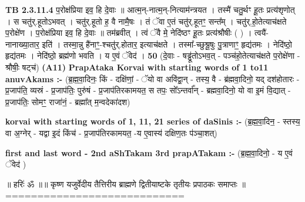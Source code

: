 \documentclass[17pt]{extarticle}
\begin{document}
                                \textbf{ TB 2.3.11.4} \newline
                  प॒रोक्ष॑प्रिया इव॒ हि दे॒वाः ॥ आत्म॒न्-नात्म॒न्-नित्याम॑न्त्रयत । तस्मै॑ चतु॒र्थꣳ हू॒तः प्रत्य॑शृणोत् । स चतु॑र्.हूतोऽभवत् । चतु॑र्.हूतो ह॒ वै नामै॒षः । तं ॅवा ए॒तं चतु॑र्.हूतꣳ॒॒ सन्त᳚म् । चतु॑र्.हो॒तेत्याच॑क्षते प॒रोक्षे॑ण । प॒रोक्ष॑प्रिया इव॒ हि दे॒वाः ॥ तम॑ब्रवीत् । त्वं ॅवै मे॒ नेदि॑ष्ठꣳ हू॒तः प्रत्य॑श्रौषीः ( ) । त्वयै॑-नानाख्या॒तार॒ इति॑ । तस्मा॒न्नु है॑नाꣳ॒॒-श्चतु॑र्.होतार॒ इत्याच॑क्षते । तस्मा᳚-च्छुश्रू॒षुः पु॒त्राणाꣳ॒॒ हृद्य॑तमः । नेदि॑ष्ठो॒ हृद्य॑तमः । नेदि॑ष्ठो॒ ब्रह्म॑णो भवति । य ए॒वं ॅवेद॑ । \textbf{ 50} \newline
                  \newline
                                    (दे॒वाः - षड्ढू॑तोऽभव॒त् - पञ्च॑हो॒तेत्याच॑क्षते प॒रोक्षे॑णा - श्रौषीः॒ षट्च॑) \textbf{(A11)} \newline \newline
                \textbf{PrapAtaka Korvai with starting  words of 1 to11 anuvAkams :-} \newline
        (ब्र॒ह्म॒वा॒दिनः॒ किं - दक्षि॑णां॒ - ॅयो वा अवि॑द्वा॒न् - तस्य॒ वै - ब्र॑ह्मवा॒दिनो॒ यद् दश॑होतारः - प्र॒जाप॑ति॒ व्यस्रं - प्र॒जाप॑तिः॒ पुरु॑षं - प्र॒जाप॑तिरकामयत॒ स तपः॒ सो᳚ऽन्तर्वा᳚न् - ब्रह्मवा॒दिनो॒ यो वा इ॒मं वि॒द्यात् - प्र॒जाप॑तिः॒ सोमꣳ॒॒ राजा॑नं॒ - ब्रह्मा᳚त् म॒न्वदेका॑दश) \newline

        \textbf{korvai with starting words of 1, 11, 21 series of daSinis :-} \newline
        (ब्र॒ह्म॒वा॒दिन॒ - स्तस्य॒ वा अ॒ग्नेर् - यद्वा इ॒दं किंच॑ - प्र॒जाप॑तिरकामयत॒ -य ए॒वास्य॑ दक्षिण॒तः प॑ञ्चा॒शत्) \newline

        \textbf{first and last  word - 2nd aShTakam 3rd prapATakam :-} \newline
        (ब्र॒ह्म॒वा॒दिनो॒ - य ए॒वं ॅवेद॑ ) \newline 

       

        ॥ हरिः॑ ॐ ॥॥ कृष्ण यजुर्वेदीय तैत्तिरीय ब्राह्मणे द्वितीयाष्टके तृतीयः प्रपाठकः समाप्तः ॥
============================ \newline
        \pagebreak
        
        
        
\end{document}
